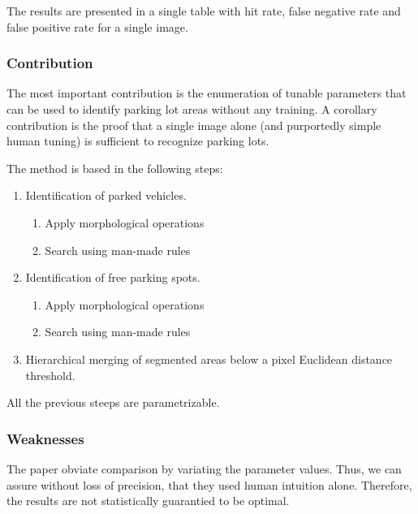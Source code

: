 \documentclass[]{article}
\providecommand{\tightlist}{%
  \setlength{\itemsep}{0pt}\setlength{\parskip}{0pt}}
\begin{document}
The results are presented in a single table with hit rate, false negative rate and false positive rate for a single image.

\hypertarget{contribution}{%
\subsubsection{Contribution}\label{contribution}}

The most important contribution is the enumeration of tunable parameters that can be used to identify parking lot areas without any training. A corollary contribution is the proof that a single image alone (and purportedly simple human tuning) is sufficient to recognize parking lots.

The method is based in the following steps:

\begin{enumerate}
\def\labelenumi{\arabic{enumi}.}
\tightlist
\item
  Identification of parked vehicles.

  \begin{enumerate}
  \def\labelenumii{\arabic{enumii}.}
  \tightlist
  \item
    Apply morphological operations
  \item
    Search using man-made rules
  \end{enumerate}
\item
  Identification of free parking spots.

  \begin{enumerate}
  \def\labelenumii{\arabic{enumii}.}
  \tightlist
  \item
    Apply morphological operations
  \item
    Search using man-made rules
  \end{enumerate}
\item
  Hierarchical merging of segmented areas below a pixel Euclidean distance threshold.
\end{enumerate}

All the previous steeps are parametrizable.

\hypertarget{weaknesses}{%
\subsubsection{Weaknesses}\label{weaknesses}}

The paper obviate comparison by variating the parameter values. Thus, we can assure without loss of precision, that they used human intuition alone. Therefore, the results are not statistically guarantied to be optimal.
\end{document}
